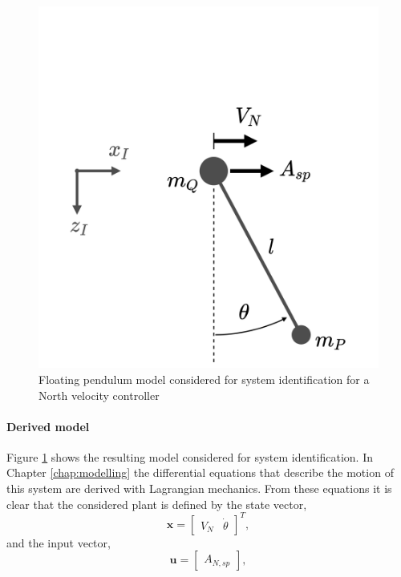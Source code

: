     \begin{figure}[h]
        \centering
        \includegraphics[width=0.5\linewidth]{floating_pend.png}            
        \caption{Floating pendulum model considered for system identification for a North velocity controller}
        \label{fig:floating_pend}
    \end{figure}

    \paragraph{Derived model}
    Figure \ref{fig:floating_pend} shows the resulting model considered for system identification.
    In Chapter \ref{chap:modelling} the differential equations that describe the motion of this system are derived with Lagrangian mechanics.
    From these equations it is clear that the considered plant is defined by the state vector,
    \begin{equation}
        \bm{x} = \begin{bmatrix}
            V_N & \dot{\theta}
        \end{bmatrix}^T,
    \end{equation}
    and the input vector,
    \begin{equation}
        \bm{u} = \begin{bmatrix}
            A_{N,sp}
        \end{bmatrix},
    \end{equation}


